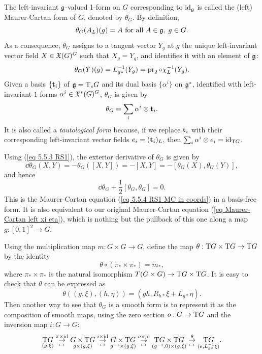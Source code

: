 \begin{defn}
    The left-invariant $\frakg$-valued 1-form on $G$ corresponding to $\id_\frakg$ is called the (left) Maurer-Cartan form of $G$, denoted by $\theta_G$. By definition,
    \[\theta_G(A_L)(g)=A\text{ for all }A\in\frakg,\; g\in G.\]
    As a consequence, $\theta_G$ assigns to a tangent vector $Y_g$ at $g$ the unique left-invariant vector field $X\in\fX(G)^G$ such that $X_g=Y_g$, and identifies it with an element of $\frakg$:
    \[\theta_G(Y)(g)=L_{g\ast}^{-1}(Y_g)=\pr_2\circ \chi_L^{-1}(Y_g).\]
    Given a basis $\{\bf{t}_i\}$ of $\frakg=\T_eG$ and its dual basis $\{\alpha^i\}$ on $\frakg^\ast$, identified with left-invariant $1$-forms $\alpha^i\in\fX^\ast(G)^G$, $\theta_G$ is given by
    \[\theta_G=\sum_i \alpha^i\otimes \bf{t}_i.\]
    It is also called a \emph{tautological form} because, if we replace $\bf{t}_i$ with their corresponding left-invariant vector fields $e_i=(\bf{t}_i)_L$, then $\sum_i \alpha^i\otimes e_i=\id_{\T G}$.

    Using (\ref{eq 5.5.3 RS1}), the exterior derivative of $\theta_G$ is given by
    \[\dd\theta_G(X,Y)=-\theta_G([X,Y])=-[X,Y]=-[\theta_G(X),\theta_G(Y)],\]
    and hence
    \[\dd\theta_G +\frac12 [\theta_G,\theta_G]=0.\label{eq 5.5.10 RS1 maurer-cartan}\]
    This is the Maurer-Cartan equation (\ref{eq 5.5.4 RS1 MC in coords}) in a basis-free form. It is also equivalent to our original Maurer-Cartan equation (\ref{eq Maurer-Cartan left xi eta}), which is nothing but the pullback of this one along a map $g:[0,1]^2\to G$. 
\end{defn}

\begin{rem}
    Using the multiplication map $m:G\times G\to G$, define the map $\theta:\T G\times \T G\to \T G$ by the identity
    \[\theta\circ (\pi_\ast\times \pi_\ast)=m_\ast,\]
    where $\pi_\ast\times \pi_\ast$ is the natural isomorphism $T(G\times G)\to \T G\times \T G$. It is easy to check that $\theta$ can be expressed as
    \[\theta\left((g,\xi),(h,\eta)\right)=(gh,R_{h\ast}\xi+L_{g\ast}\eta).\label{eq m_ast}\]
    Then another way to see that $\theta_G$ is a smooth form is to represent it as the composition of smooth maps, using the zero section $o:G\to \T G$ and the inversion map $i:G\to G$:
    \[\underset{(g,\xi)}{\T G}
    \underset{\mapsto}{\overset{\pi\times\id}{\to}}
    \underset{g\times (g,\xi)}{G\times \T G}
    \underset{\mapsto}{\overset{i\times\id}{\to}}
    \underset{g^{-1}\times (g,\xi)}{G\times \T G}
    \underset{\mapsto}{\overset{o\times\id}{\to}}
    \underset{(g^{-1},0)\times (g,\xi)}{\T G\times \T G}
    \underset{\mapsto}{\overset{\theta}{\to}}
    \underset{(e,L_{g\ast}^{-1}\xi)}{\T G}.\label{eq MC form as composition}
    \]
\end{rem}

